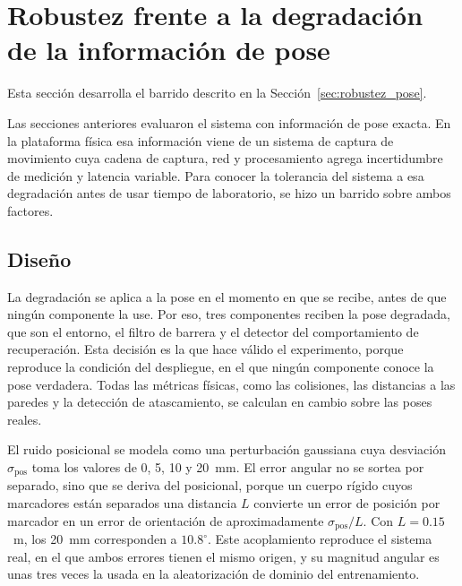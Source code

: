 \section{Robustez frente a la degradación de la información de pose}
\label{anx:robustez}

Esta sección desarrolla el barrido descrito en la
Sección~\ref{sec:robustez_pose}.


Las secciones anteriores evaluaron el sistema con información de pose exacta. En la plataforma física esa información viene de un sistema de captura de movimiento cuya cadena de captura, red y procesamiento agrega incertidumbre de medición y latencia variable. Para conocer la tolerancia del sistema a esa degradación antes de usar tiempo de laboratorio, se hizo un barrido sobre ambos factores.

\subsection*{Diseño}

La degradación se aplica a la pose en el momento en que se recibe, antes de que ningún componente la use. Por eso, tres componentes reciben la pose degradada, que son el entorno, el filtro de barrera y el detector del comportamiento de recuperación. Esta decisión es la que hace válido el experimento, porque reproduce la condición del despliegue, en el que ningún componente conoce la pose verdadera. Todas las métricas físicas, como las colisiones, las distancias a las paredes y la detección de atascamiento, se calculan en cambio sobre las poses reales.

El ruido posicional se modela como una perturbación gaussiana cuya desviación
$\sigma_{\text{pos}}$ toma los valores de 0, 5, 10 y 20~mm. El error angular no
se sortea por separado, sino que se deriva del posicional, porque un cuerpo
rígido cuyos marcadores están separados una distancia $L$ convierte un error de
posición por marcador en un error de orientación de aproximadamente
$\sigma_{\text{pos}}/L$. Con $L = 0{.}15$~m, los 20~mm corresponden a
$10{.}8^\circ$. Este acoplamiento reproduce el sistema real, en el que ambos
errores tienen el mismo origen, y su magnitud angular es unas tres veces la
usada en la aleatorización de dominio del entrenamiento.

